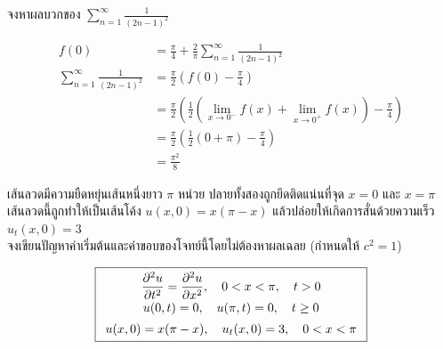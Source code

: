 \documentclass[12pt,final]{novelette} %
\begin{document}
\begin{question}[resume]
\begin{question}
        \item
        จงหาผลบวกของ $\displaystyle \sum_{n=1}^{\infty} \frac{1}{(2n - 1)^2}$ 

        \vspace*{-1em}
        \begin{align*}
            f(0)                                   & = \frac{\pi}{4} + \frac{2}{\pi}\sum_{n=1}^{\infty} \frac{1}{(2n-1)^2}                                       \\
            \sum_{n=1}^{\infty} \frac{1}{(2n-1)^2} & = \frac{\pi}{2} \left(f(0) - \frac{\pi}{4}\right)                                                           \\
                                                   & = \frac{\pi}{2} \left(\frac12 \left(\lim_{x\to0^-} f(x) + \lim_{x\to0^+} f(x)\right) - \frac{\pi}{4}\right) \\
                                                   & = \frac{\pi}{2} \left(\frac12 (0 + \pi) - \frac{\pi}{4}\right)                                              \\
                                                   & = \boxed{\frac{\pi^2}{8}}
        \end{align*}
    \end{question}

    \item {}
    เส้นลวดมีความยืดหยุ่นเส้นหนึ่งยาว $\pi$ หน่วย ปลายทั้งสองถูกยึดติดแน่นที่จุด $x = 0$ และ $x = \pi$ \\
    เส้นลวดนี้ถูกทำให้เป็นเส้นโค้ง $u(x, 0) = x(\pi - x)$ แล้วปล่อยให้เกิดการสั่นด้วยความเร็ว $u_t(x, 0) = 3$ \\
    จงเขียนปัญหาค่าเริ่มต้นและค่าขอบของโจทย์นี้โดยไม่ต้องหาผลเฉลย (กำหนดให้ $c^2 = 1$) 

    $$
        \boxed{
            \begin{array}{c} \displaystyle
                \pdv[2]{u}{t} = \pdv[2]{u}{x}, \quad 0 < x < \pi, \quad t > 0 \\[.5em]
                u(0,t) = 0, \quad u(\pi,t) = 0 , \quad t \geq 0               \\[.5em]
                u(x,0) = x(\pi - x), \quad u_t(x,0) = 3, \quad 0 < x < \pi    \\
            \end{array}
        }
    $$


\end{question}
\end{document}
